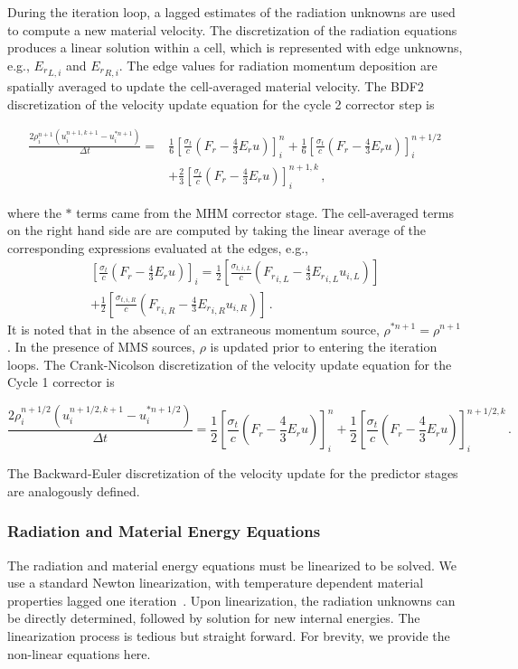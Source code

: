 \documentclass[preprint,12pt]{elsarticle}
\newcommand{\pec}{\, ,}
\newcommand{\pep}{\, .}
\newcommand{\lequ}[1]{\label{eq:#1}}
\newcommand{\half}{\frac{1}{2}}
\newcommand{\sixth}{\frac{1}{6}}
\newcommand{\E}{{E_r}}
\newcommand{\F}{{F_r}}
\newcommand{\dt}{\Delta t}
\newcommand{\iL}{_{i,L}}
\newcommand{\iR}{_{i,R}}
\newcommand{\momentumSource}{
   \left[\frac{\sigma_{t}}{c}\left(\F-\frac{4}{3}\E u\right)\right]
}
\newcommand{\momentumUpdateCN}[5]{
\begin{equation}
    \frac{#2\rho^{#4}#3\left(u^{#4,k+1}#3-u^{*#4}#3\right)}{\dt} = 
   \half\momentumSource^{#1}#3
   +\half\momentumSource^{#4,k}#3
  \pep
#5
\end{equation}
}
\newcommand{\momentumUpdateBDFTwo}[6]{
\begin{equation}\begin{split}
    \frac{#3\rho^{#5}#4\left(u^{#5,k+1}#4-u^{*#5}#4\right)}{\dt} =  
  & \sixth\momentumSource^{#1}#4
   +\sixth\momentumSource^{#2}#4\\
   &+\frac{2}{3}\momentumSource^{#5,k}#4
  \pec
#6
\end{split}\end{equation}
}
\begin{document}
During the iteration loop, a lagged estimates of the radiation unknowns are used to compute a new
material velocity.  The discretization of the radiation equations produces a linear
solution within a cell, which is represented with edge unknowns, e.g., $\E_{L,i}$ and
$\E_{R,i}$.  The edge values for radiation momentum deposition are spatially averaged to update the cell-averaged material
velocity.  
The BDF2 discretization of the velocity update equation for the cycle 2 corrector
step is
\momentumUpdateBDFTwo{n}{n+1/2}{2}{_i}{n+1}{\lequ{hydromBDF2full}}
where the $*$ terms came from the MHM corrector stage.  The cell-averaged terms on the right hand side are are computed by taking the linear
average of the corresponding expressions evaluated at the edges, e.g., 
\begin{multline}
   \left[\frac{\sigma_t}{c}\left(\F - \frac{4}{3}\E u\right)\right]_i =
   \half\left[\frac{\sigma_{t,i,L}}{c}\left(\F\iL - \frac{4}{3}\E\iL u\iL\right)\right]\\
   + \half\left[\frac{\sigma_{t,i,R}}{c}\left(\F\iR - \frac{4}{3}\E\iR u\iR\right)\right]
   \pep
\end{multline}
It is noted that in the absence of an extraneous momentum source, $\rho^{*n+1}=\rho^{n+1}$. In the
presence of MMS sources, $\rho$ is updated prior to entering the iteration loops.
The Crank-Nicolson discretization of the velocity update equation for the Cycle 1
corrector is
\momentumUpdateCN{n}{2}{_i}{n+1/2}{\lequ{hydromCNfull}}
The Backward-Euler discretization of the velocity update for the predictor stages are analogously defined.

\subsubsection{Radiation and Material Energy Equations}

The radiation and material energy equations must be linearized to be solved.  We use
a standard Newton linearization, with temperature dependent material properties lagged one
iteration~\cite{morelldsn}.  Upon linearization, the radiation unknowns can be directly
determined, followed by solution for new internal energies.  The linearization process is
tedious but straight forward.  For brevity, we provide the non-linear equations here.
\end{document}
